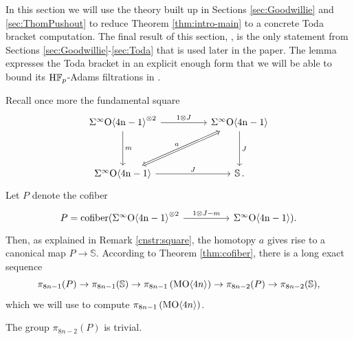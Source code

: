 In this section we will use the theory built up in Sections \ref{sec:Goodwillie} and \ref{sec:ThomPushout} to reduce Theorem \ref{thm:intro-main} to a concrete Toda bracket computation.
The final result of this section, , is the only statement from Sections \ref{sec:Goodwillie}-\ref{sec:Toda} that is used later in the paper. The lemma expresses the Toda bracket in an explicit enough form that we will be able to bound its $\mathrm{H}\mathbb{F}_p$-Adams filtrations in .

Recall once more the fundamental square
$$
\begin{tikzcd}[column sep = huge]
\sOf^{\otimes 2} \arrow{dd}{m} \arrow{r}{1 \otimes J} & \sOf \arrow{dd}{J} \\ \\
\sOf \arrow{r}{J} \arrow[Leftrightarrow]{ruu}{a} & \bS.
\end{tikzcd}
$$
Let $P$ denote the  cofiber
$$
\begin{tikzcd} [column sep = huge]
P=\mathrm{cofiber}(\sOf^{\otimes 2} \arrow{r}{1 \otimes J - m} & \sOf).
\end{tikzcd}
$$
Then, as explained in Remark \ref{cnstr:square}, the homotopy $a$ gives rise to a canonical map $P \to \mathbb{S}$.  According to Theorem \ref{thm:cofiber}, there is a long exact sequence
\begin{equation} \label{eq:les}
  \pi_{8n-1} (P) \to \pi_{8n-1} (\mathbb{S}) \to \pi_{8n-1} \left(\operatorname{\mathrm{MO}} \langle 4n \rangle\right) \to \pi_{8n-2} (P) \to \pi_{8n-2} (\mathbb{S}),
\end{equation}
which we will use to compute $\pi_{8n-1} \left( \operatorname{\mathrm{MO}} \langle 4n \rangle \right)$.

\begin{lem} \label{lem:unit-surjectivity}
    The group $\pi_{8n-2} (P)$ is trivial.
\end{lem}

